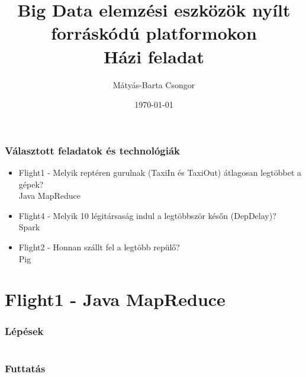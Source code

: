 \documentclass{beamer}
\title[Big Data elemzési eszközök nyílt forráskódú platformokon]{Big Data elemzési eszközök nyílt forráskódú platformokon\\ Házi feladat} %
\author{Mátyás-Barta Csongor} %
\institute[BME-MIT] %
{
VYW0YR\\
mbcsongor@yahoo.com \\%
}
\date{\today} %
\begin{document}
\begin{frame}[plain]
\titlepage %
\end{frame}

\begin{frame}
\frametitle{Választott feladatok és technológiák} 
\begin{itemize}
	\item Flight1 - Melyik reptéren gurulnak (TaxiIn és TaxiOut) átlagosan legtöbbet a gépek? \\
		Java MapReduce
	\item Flight4 - Melyik 10 légitársaság indul a legtöbbször későn (DepDelay)? \\
		Spark
	\item Flight2 - Honnan szállt fel a legtöbb repülő? \\
		Pig
\end{itemize}


\section{Flight1 - Java MapReduce} %

\begin{frame}
\frametitle{Lépések}
\begin{columns}[t] 
		
		
		
\end{columns}
\end{frame}


\begin{frame}
\frametitle{Futtatás}

\end{frame}



\end{frame}
\end{document}
